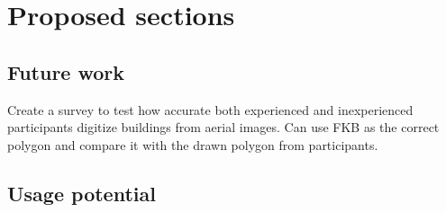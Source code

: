 \chapter{Proposed sections}

\section{Future work}

Create a survey to test how accurate both experienced and inexperienced participants digitize buildings from aerial images. Can use FKB as the correct polygon and compare it with the drawn polygon from participants. 

\section{Usage potential}

